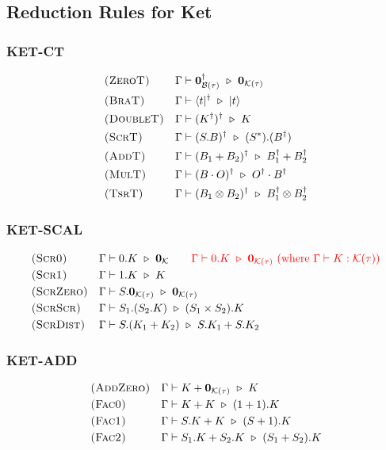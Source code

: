 \subsection{Reduction Rules for Ket}

\subsubsection*{\textsf{KET-CT}}
\begin{align*}
  & \textsc{(ZeroT)} && \Gamma \vdash \mathbf{0}_{\mathcal{B}(\tau)}^\dagger \ \triangleright\  \mathbf{0}_{\mathcal{K}(\tau)} \\
  & \textsc{(BraT)} && \Gamma \vdash \langle t|^\dagger \ \triangleright\  |t\rangle\\
  & \textsc{(DoubleT)} && \Gamma \vdash (K^\dagger)^\dagger \ \triangleright\  K \\
  & \textsc{(ScrT)} && \Gamma \vdash (S.B)^\dagger \ \triangleright\  (S^*).(B^\dagger) \\
  & \textsc{(AddT)} && \Gamma \vdash (B_1 + B_2)^\dagger \ \triangleright\  B_1^\dagger + B_2^\dagger\\
  & \textsc{(MulT)} && \Gamma \vdash (B \cdot O)^\dagger \ \triangleright\  O^\dagger \cdot B^\dagger \\
  & \textsc{(TsrT)} && \Gamma \vdash (B_1 \otimes B_2)^\dagger \ \triangleright\  B_1^\dagger \otimes B_2^\dagger
\end{align*}

\subsubsection*{\textsf{KET-SCAL}}
\begin{align*}
  & \textsc{(Scr0)} && \Gamma \vdash 0.K \ \triangleright\  \textbf{0}_{\mathcal{K}}
  \qquad
  \textcolor{red}{\Gamma \vdash 0.K \ \triangleright\  \mathbf{0}_{\mathcal{K}(\tau)}\ \textrm{(where $\Gamma \vdash K : \mathcal{K}(\tau)$)}} \\
  & \textsc{(Scr1)} && \Gamma \vdash 1.K \ \triangleright\  K \\
  & \textsc{(ScrZero)} && \Gamma \vdash S.\mathbf{0}_{\mathcal{K}(\tau)} \ \triangleright\  \mathbf{0}_{\mathcal{K}(\tau)} \\
  & \textsc{(ScrScr)} && \Gamma \vdash S_1.(S_2.K) \ \triangleright\  (S_1 \times S_2).K \\
  & \textsc{(ScrDist)} && \Gamma \vdash S.(K_1 + K_2) \ \triangleright\  S.K_1 + S.K_2
\end{align*}

\subsubsection*{\textsf{KET-ADD}}
\begin{align*}
  & \textsc{(AddZero)} && \Gamma \vdash K + \mathbf{0}_{\mathcal{K}(\tau)} \ \triangleright\  K \\
  & \textsc{(Fac0)} && \Gamma \vdash K + K \ \triangleright\  (1 + 1).K \\
  & \textsc{(Fac1)} && \Gamma \vdash S.K + K \ \triangleright\  (S + 1).K \\
  & \textsc{(Fac2)} && \Gamma \vdash S_1.K + S_2.K \ \triangleright\  (S_1 + S_2).K
\end{align*}


